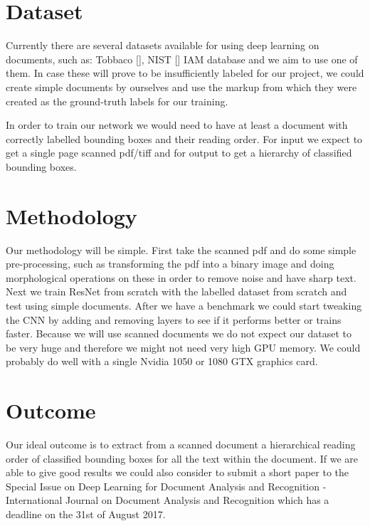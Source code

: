 \documentclass[10pt,twocolumn,letterpaper]{article}
\begin{document}
\section{Dataset}
Currently there are several datasets available for using deep learning on documents, such as: Tobbaco [], NIST [] IAM database and we aim to use one of them. In case these will prove to be insufficiently labeled for our project, we could create simple documents by ourselves and use the markup from which they were created as the ground-truth labels for our training. 

In order to train our network we would need to have at least a document with correctly labelled bounding boxes and their reading order. For input we expect to get a single page scanned pdf/tiff and for output to get a hierarchy of classified bounding boxes.

\section{Methodology}
Our methodology will be simple. First take the scanned pdf and do some simple pre-processing, such as transforming the pdf into a binary image and doing morphological operations on these in order to remove noise and have sharp text.
Next we train ResNet from scratch with the labelled dataset from scratch and test using simple documents. After we have a benchmark we could start tweaking the CNN by adding and removing layers to see if it performs better or trains faster.
Because we will use scanned documents we do not expect our dataset to be very huge and therefore we might not need very high GPU memory. We could probably do well with a single Nvidia 1050 or 1080 GTX graphics card. 

\section{Outcome}
Our ideal outcome is to extract from a scanned document a hierarchical reading order of classified bounding boxes for all the text within the document. If we are able to give good results we could also consider to submit a short paper to the Special Issue on Deep Learning for Document Analysis and Recognition - International Journal on Document Analysis and Recognition which has a deadline on the 31st of August 2017.
{\small


}
\end{document}
